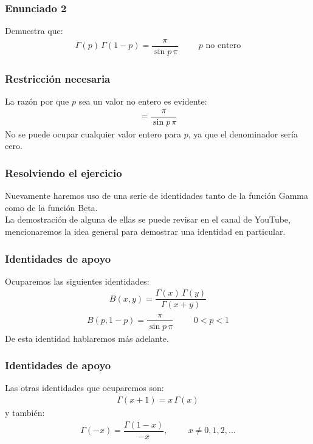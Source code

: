 \documentclass[12pt]{beamer}
\begin{document}
\begin{frame}
\frametitle{Enunciado 2}
Demuestra que:
\begin{align*}
\Gamma(p) \, \Gamma(1 - p) = \dfrac{\pi}{\sin p \, \pi} \hspace{1cm} p \mbox{ no entero}
\end{align*}


\end{frame}
\begin{frame}
\frametitle{Restricción necesaria}
La razón por que $p$ sea un valor no entero es evidente:
\pause
\begin{align*}
= \dfrac{\pi}{\sin p \, \pi} 
\end{align*}
No se puede ocupar cualquier valor entero para $p$, ya que el denominador sería cero.
\end{frame}
\begin{frame}
\frametitle{Resolviendo el ejercicio}
Nuevamente haremos uso de una serie de identidades tanto de la función Gamma como de la función Beta.
\\
\bigskip
\pause
La demostración de alguna de ellas se puede revisar en el canal de YouTube, \pause mencionaremos la idea general para demostrar una identidad en particular.
\end{frame}
\begin{frame}
\frametitle{Identidades de apoyo}
Ocuparemos las siguientes identidades:
\pause
\begin{align}
B(x, y) = \dfrac{\Gamma(x) \, \Gamma(y)}{\Gamma(x + y)}
\label{eq:ecuacion_01}
\end{align}
\pause
\begin{align}
B(p, 1 - p) = \dfrac{\pi}{\sin p \, \pi} \hspace{1cm} 0 < p < 1
\label{eq:ecuacion_02}
\end{align}
\pause
De esta identidad hablaremos más adelante.
\end{frame}
\begin{frame}
\frametitle{Identidades de apoyo}
Las otras identidades que ocuparemos son:
\pause
\begin{align}
\Gamma(x + 1) = x \, \Gamma(x)
\label{eq:ecuacion_03}
\end{align}
y también:
\pause
\begin{align}
\Gamma(-x) = \dfrac{\Gamma(1 - x)}{-x}, \hspace{1cm} x \neq 0, 1, 2, \ldots
\label{eq:ecuacion_04}
\end{align}
\end{frame}
\end{document}
